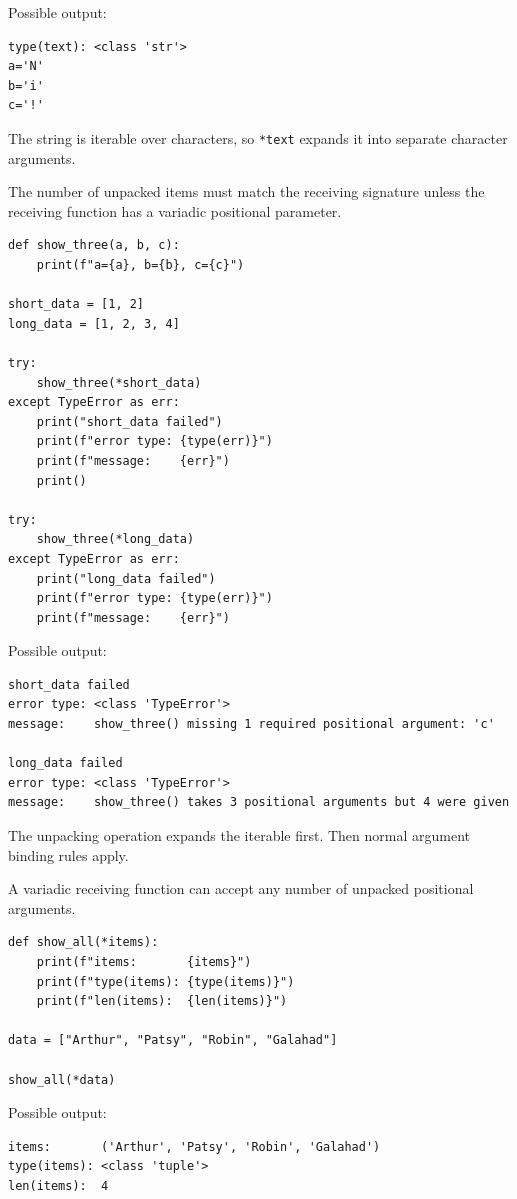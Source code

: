 Possible output:

\begin{verbatim}
type(text): <class 'str'>
a='N'
b='i'
c='!'
\end{verbatim}

The string is iterable over characters, so \texttt{*text} expands it into separate character arguments.

The number of unpacked items must match the receiving signature unless the receiving function has a variadic positional parameter.

\begin{verbatim}
def show_three(a, b, c):
    print(f"a={a}, b={b}, c={c}")

short_data = [1, 2]
long_data = [1, 2, 3, 4]

try:
    show_three(*short_data)
except TypeError as err:
    print("short_data failed")
    print(f"error type: {type(err)}")
    print(f"message:    {err}")
    print()

try:
    show_three(*long_data)
except TypeError as err:
    print("long_data failed")
    print(f"error type: {type(err)}")
    print(f"message:    {err}")
\end{verbatim}

Possible output:

\begin{verbatim}
short_data failed
error type: <class 'TypeError'>
message:    show_three() missing 1 required positional argument: 'c'

long_data failed
error type: <class 'TypeError'>
message:    show_three() takes 3 positional arguments but 4 were given
\end{verbatim}

The unpacking operation expands the iterable first. Then normal argument binding rules apply.

A variadic receiving function can accept any number of unpacked positional arguments.

\begin{verbatim}
def show_all(*items):
    print(f"items:       {items}")
    print(f"type(items): {type(items)}")
    print(f"len(items):  {len(items)}")

data = ["Arthur", "Patsy", "Robin", "Galahad"]

show_all(*data)
\end{verbatim}

Possible output:

\begin{verbatim}
items:       ('Arthur', 'Patsy', 'Robin', 'Galahad')
type(items): <class 'tuple'>
len(items):  4
\end{verbatim}

